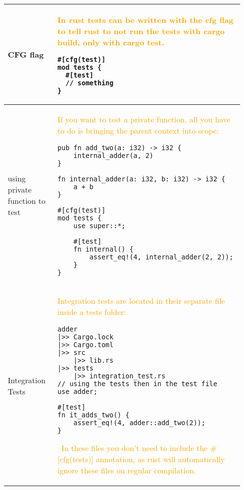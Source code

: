 \documentclass[main.tex,fontsize=8pt,paper=a4,paper=portrait,DIV=calc,]{scrartcl}
\begin{document}
\begin{table}[ht!]
\begin{tabular}{|m{0.2\linewidth}|m{0.755\linewidth}|}
\hline
CFG flag & 
\textcolor{orange}{In rust tests can be written with the cfg flag to tell rust to not run the tests with cargo build, only with cargo test.}\newline 
\begin{lstlisting}
#[cfg(test)]
mod tests {
  #[test]
  // something
}
\end{lstlisting}\\
\hline
using private function to test & 
\textcolor{orange}{If you want to test a private function, all you have to do is bringing the parent context into scope:}\newline
\begin{lstlisting}
pub fn add_two(a: i32) -> i32 {
    internal_adder(a, 2)
}

fn internal_adder(a: i32, b: i32) -> i32 {
    a + b
}

#[cfg(test)]
mod tests {
    use super::*;

    #[test]
    fn internal() {
        assert_eq!(4, internal_adder(2, 2));
    }
}
\end{lstlisting}\\
\hline
Integration Tests &
\textcolor{orange}{Integration tests are located in their separate file inside a tests folder:}\newline
\begin{lstlisting}
adder
|>> Cargo.lock
|>> Cargo.toml
|>> src
    |>> lib.rs
|>> tests
    |>> integration_test.rs
// using the tests then in the test file
use adder;

#[test]
fn it_adds_two() {
    assert_eq!(4, adder::add_two(2));
}
\end{lstlisting} 
\, \newline
\textcolor{orange}{In these files you don't need to include the \#[cfg(tests)] annotation, as rust will automatically ignore these files on regular compilation.}\\
\hline
\end{tabular}
\end{table}
\pagebreak 
\end{document}
